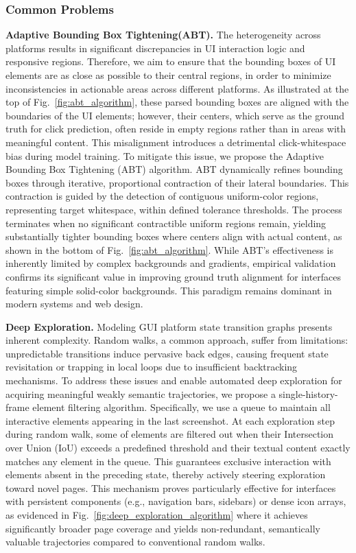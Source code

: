 \subsubsection{Common Problems}
\textbf{Adaptive Bounding Box Tightening(ABT).} 
The heterogeneity across platforms results in significant discrepancies in UI interaction logic and responsive regions. Therefore, we aim to ensure that the bounding boxes of UI elements are as close as possible to their central regions, in order to minimize inconsistencies in actionable areas across different platforms.
% 
As illustrated at the top of Fig.~\ref{fig:abt_algorithm}, these parsed bounding boxes are aligned with the boundaries of the UI elements; however, their centers, which serve as the ground truth for click prediction, often reside in empty regions rather than in areas with meaningful content.
% 
This misalignment introduces a detrimental click-whitespace bias during model training. To mitigate this issue, we propose the Adaptive Bounding Box Tightening (ABT) algorithm. 
% 
ABT dynamically refines bounding boxes through iterative, proportional contraction of their lateral boundaries. This contraction is guided by the detection of contiguous uniform-color regions, representing target whitespace, within defined tolerance thresholds. The process terminates when no significant contractible uniform regions remain, yielding substantially tighter bounding boxes where centers align with actual content, as shown in the bottom of Fig.~\ref{fig:abt_algorithm}. While ABT's effectiveness is inherently limited by complex backgrounds and gradients, empirical validation confirms its significant value in improving ground truth alignment for interfaces featuring simple solid-color backgrounds. This paradigm remains dominant in modern systems and web design.

\textbf{Deep Exploration.} 
Modeling GUI platform state transition graphs presents inherent complexity. Random walks, a common approach, suffer from limitations: unpredictable transitions induce pervasive back edges, causing frequent state revisitation or trapping in local loops due to insufficient backtracking mechanisms. To address these issues and enable automated deep exploration for acquiring meaningful weakly semantic trajectories, we propose a single-history-frame element filtering algorithm.
% 
Specifically, we use a queue to maintain all interactive elements appearing in the last screenshot. 
% 
At each exploration step during random walk, some of elements are filtered out when their Intersection over Union (IoU) exceeds a predefined threshold and their textual content exactly matches any element in the queue. 
% 
This guarantees exclusive interaction with elements absent in the preceding state, thereby actively steering exploration toward novel pages. 
% 
This mechanism proves particularly effective for interfaces with persistent components (e.g., navigation bars, sidebars) or dense icon arrays, as evidenced in Fig.~\ref{fig:deep_exploration_algorithm} where it achieves significantly broader page coverage and yields non-redundant, semantically valuable trajectories compared to conventional random walks.

